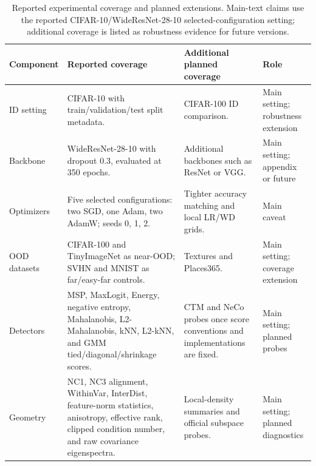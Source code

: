 \begin{table}[t]
\caption{Reported experimental coverage and planned extensions. Main-text claims
use the reported CIFAR-10/WideResNet-28-10 selected-configuration setting;
additional coverage is listed as robustness evidence for future versions.}
\label{tab:experiment-inventory}
\begin{center}
\small
\setlength{\tabcolsep}{4pt}
\renewcommand{\arraystretch}{1.12}
\begin{tabular}{@{}>{\raggedright\arraybackslash}p{}>{\raggedright\arraybackslash}p{}>{\raggedright\arraybackslash}p{}>{\raggedright\arraybackslash}p{}@{}}
\toprule
Component & Reported coverage & Additional planned coverage & Role \\
\midrule
ID setting
& CIFAR-10 with train/validation/test split metadata.
& CIFAR-100 ID comparison.
& Main setting; robustness extension \\
Backbone
& WideResNet-28-10 with dropout 0.3, evaluated at 350 epochs.
& Additional backbones such as ResNet or VGG.
& Main setting; appendix or future \\
Optimizers
& Five selected configurations: two SGD, one Adam, two AdamW; seeds 0, 1, 2.
& Tighter accuracy matching and local LR/WD grids.
& Main caveat \\
OOD datasets
& CIFAR-100 and TinyImageNet as near-OOD; SVHN and MNIST as far/easy-far controls.
& Textures and Places365.
& Main setting; coverage extension \\
Detectors
& MSP, MaxLogit, Energy, negative entropy, Mahalanobis, L2-Mahalanobis, kNN, L2-kNN, and GMM tied/diagonal/shrinkage scores.
& CTM and NeCo probes once score conventions and implementations are fixed.
& Main setting; planned probes \\
Geometry
& NC1, NC3 alignment, WithinVar, InterDist, feature-norm statistics, anisotropy, effective rank, clipped condition number, and raw covariance eigenspectra.
& Local-density summaries and official subspace probes.
& Main setting; planned diagnostics \\
\bottomrule
\end{tabular}
\end{center}
\end{table}
